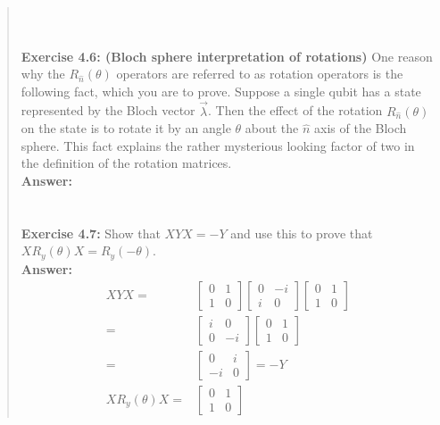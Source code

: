 \documentclass[UTF8]{ctexart}
\begin{document}
\begin{quote}
\begin{equation}
\begin{aligned}
	\end{aligned}
\end{equation}
\\
\\
\textbf{Exercise 4.6: (Bloch sphere interpretation of rotations) } One reason why the $R_{\hat{n}}(\theta)$ operators are 
referred to as rotation operators is the following fact, which you are to prove. Suppose a single qubit 
has a state represented by the Bloch vector $\vec{\lambda}$. Then the effect of the rotation  $R_{\hat{n}}(\theta)$  on the state is 
to rotate it by an angle $\theta$ about the $\hat{n} $ axis of the Bloch sphere. This fact explains the rather mysterious 
looking factor of two in the definition of the rotation matrices.
\\
\textbf{Answer:}\\
\\
\\
\textbf{Exercise 4.7: } Show that $XYX = −Y$ and use this to prove that $XR_{y}(\theta)X = R_{y}(−\theta)$.
\\
	\textbf{Answer:}\\
	\begin{equation}
		\begin{aligned}
			XYX=&\begin{bmatrix}
				0 & 1 \\ 1 &0
			\end{bmatrix}
			\begin{bmatrix}
				 0 &-i \\ i & 0
			\end{bmatrix}
			\begin{bmatrix}
				0 & 1 \\ 1 & 0	
			\end{bmatrix} \\
			=&\begin{bmatrix}
				 i & 0	\\ 0 & -i 
			\end{bmatrix}
			\begin{bmatrix}
				0 & 1 \\ 1 & 0	
			\end{bmatrix} \\
			=&\begin{bmatrix}
				0 &i \\ -i & 0
			\end{bmatrix} =-Y \\
			XR_{y}(\theta)X=&\begin{bmatrix}
				0 & 1 \\ 1 &0
			\end{bmatrix}

\end{aligned}
\end{equation}
\end{quote}
\end{document}
